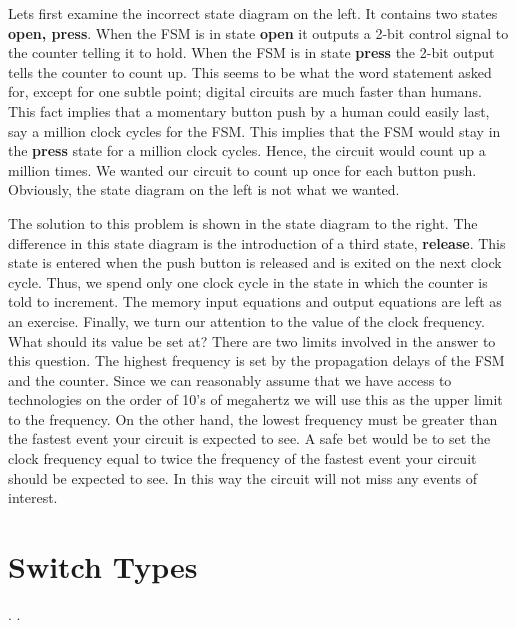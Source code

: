 Lets first examine the incorrect state diagram on the left.  It
contains two states {\bf open, press}.  When the FSM is in state
{\bf open} it outputs a 2-bit control signal to the counter
telling it to hold.  When the FSM is in state {\bf press} the
2-bit output tells the counter to count up.  This seems to be
what the word statement asked for, except for one subtle point; digital
circuits are much faster than humans.  This fact implies that
a momentary button push by a human could easily last, say
a million clock cycles for the FSM.  This implies that the FSM
would stay in the {\bf press} state for a million clock cycles.
Hence, the circuit would count up a million times.  We wanted
our circuit to count up once for each button push.  Obviously,
the state diagram on the left is not what we wanted.

The solution to this problem is shown in the state diagram to
the right.  The difference in this state diagram is the introduction
of a third state, {\bf release}.  This state is entered when the
push button is released and is exited on the next clock cycle.
Thus, we spend only one clock cycle in the state in which the
counter is told to increment.  The memory input equations and
output equations are left as an exercise.
Finally, we turn our attention to the value of the clock frequency.
What should its value be set at?  There are two limits involved
in the answer to this question.  The highest frequency is set by
the propagation delays of the FSM and the counter.  Since we
can reasonably assume that we have access to technologies on the
order of 10's of megahertz we will use this as the upper limit
to the frequency.  On the other hand, the lowest
frequency must be greater than the fastest event your circuit
is expected to see.  A safe bet would be to set the clock
frequency equal to twice the frequency of the fastest event your
circuit should be expected to see.   In this way the circuit
will not miss any events of interest.

\section{Switch Types}
\pagebreak
.
\pagebreak
.

